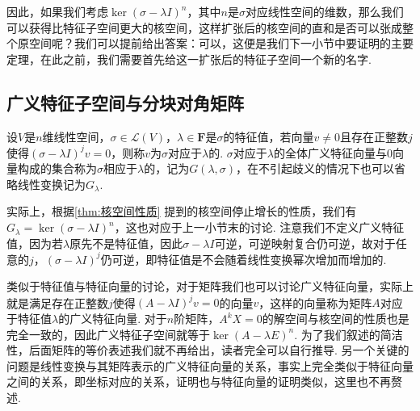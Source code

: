 因此，如果我们考虑$\ker(\sigma-\lambda I)^n$，其中$n$是$\sigma$对应线性空间的维数，那么我们可以获得比特征子空间更大的核空间，这样扩张后的核空间的直和是否可以张成整个原空间呢？我们可以提前给出答案：可以，这便是我们下一小节中要证明的主要定理，在此之前，我们需要首先给这一扩张后的特征子空间一个新的名字.

\subsection{广义特征子空间与分块对角矩阵}

\begin{definition}{}{}
    设$V$是$n$维线性空间，$\sigma\in \mathcal{L}(V)$，$\lambda\in\mathbf{F}$是$\sigma$的特征值，若向量$v\neq 0$且存在正整数$j$使得$(\sigma-\lambda I)^jv=0$，则称$v$为$\sigma$对应于$\lambda$的. $\sigma$对应于$\lambda$的全体广义特征向量与0向量构成的集合称为$\sigma$相应于$\lambda$的，记为$G(\lambda,\sigma)$，在不引起歧义的情况下也可以省略线性变换记为$G_\lambda$.
\end{definition}

实际上，根据\autoref{thm:核空间性质} 提到的核空间停止增长的性质，我们有$G_\lambda=\ker (\sigma-\lambda I)^n$，这也对应于上一小节末的讨论. 注意我们不定义广义特征值，因为若$\lambda$原先不是特征值，因此$\sigma-\lambda I$可逆，可逆映射复合仍可逆，故对于任意的$j$，$(\sigma-\lambda I)^j$仍可逆，即特征值是不会随着线性变换幂次增加而增加的.

类似于特征值与特征向量的讨论，对于矩阵我们也可以讨论广义特征向量，实际上就是满足存在正整数$j$使得$(A-\lambda I)^jv=0$的向量$v$，这样的向量称为矩阵$A$对应于特征值$\lambda$的广义特征向量. 对于$n$阶矩阵，$A^kX=0$的解空间与核空间的性质也是完全一致的，因此广义特征子空间就等于$\ker(A-\lambda E)^n$. 为了我们叙述的简洁性，后面矩阵的等价表述我们就不再给出，读者完全可以自行推导. 另一个关键的问题是线性变换与其矩阵表示的广义特征向量的关系，事实上完全类似于特征向量之间的关系，即坐标对应的关系，证明也与特征向量的证明类似，这里也不再赘述.

